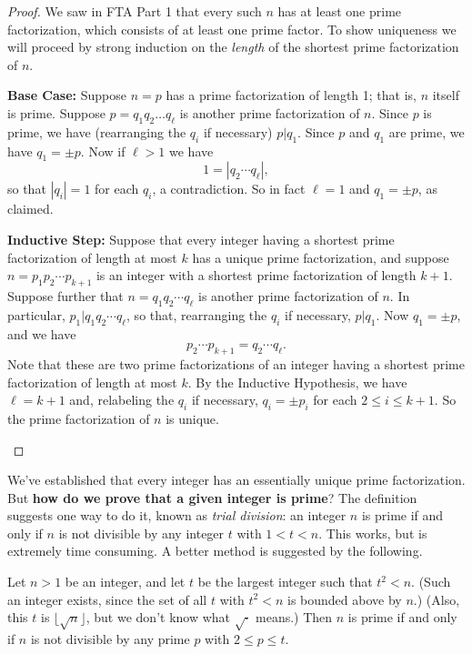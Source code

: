 \begin{proof}
We saw in FTA Part 1 that every such \(n\) has at least one prime factorization, which consists of at least one prime factor.
To show uniqueness we will proceed by strong induction on the \emph{length} of the shortest prime factorization of \(n\).
\begin{inlineproplist}
\item \textbf{Base Case:} Suppose \(n = p\) has a prime factorization of length 1; that is, \(n\) itself is prime.
Suppose \(p = q_1q_2 \ldots q_\ell\) is another prime factorization of \(n\).
Since \(p\) is prime, we have (rearranging the \(q_i\) if necessary) \(p|q_1\).
Since \(p\) and \(q_1\) are prime, we have \(q_1 = \pm p\).
Now if \(\ell > 1\) we have \[ 1 = |q_2 \cdots q_\ell|, \] so that \(|q_i| = 1\) for each \(q_i\), a contradiction.
So in fact \(\ell = 1\) and \(q_1 = \pm p\), as claimed.
\item \textbf{Inductive Step:} Suppose that every integer having a shortest prime factorization of length at most \(k\) has a unique prime factorization, and suppose \(n = p_1p_2 \cdots p_{k+1}\) is an integer with a shortest prime factorization of length \(k+1\).
Suppose further that \(n = q_1q_2 \cdots q_\ell\) is another prime factorization of \(n\).
In particular, \(p_1 | q_1q_2 \cdots q_\ell\), so that, rearranging the \(q_i\) if necessary, \(p|q_1\).
Now \(q_1 = \pm p\), and we have \[p_2 \cdots p_{k+1} = q_2 \cdots q_\ell. \]
Note that these are two prime factorizations of an integer having a shortest prime factorization of length at most \(k\).
By the Inductive Hypothesis, we have \(\ell = k+1\) and, relabeling the \(q_i\) if necessary, \(q_i = \pm p_i\) for each \(2 \leq i \leq k+1\).
So the prime factorization of \(n\) is unique.
\end{inlineproplist}
\end{proof}

We've established that every integer has an essentially unique prime factorization.
But \textbf{how do we prove that a given integer is prime}?
The definition suggests one way to do it, known as \emph{trial division}: an integer \(n\) is prime if and only if \(n\) is not divisible by any integer \(t\) with \(1 < t < n\).
This works, but is extremely time consuming.
A better method is suggested by the following.

\begin{prop}
Let \(n > 1\) be an integer, and let \(t\) be the largest integer such that \(t^2 < n\).
(Such an integer exists, since the set of all \(t\) with \(t^2 < n\) is bounded above by \(n\).)
(Also, this \(t\) is \(\lfloor \sqrt{n} \rfloor\), but we don't know what \(\sqrt{\cdot}\) means.)
Then \(n\) is prime if and only if \(n\) is not divisible by any prime \(p\) with \(2 \leq p \leq t\).
\end{prop}


